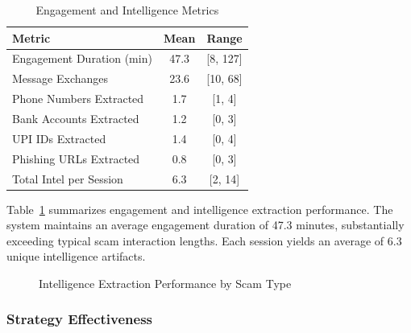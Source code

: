 \documentclass[conference]{IEEEtran}
\begin{document}
\begin{table}[htbp]
\caption{Engagement and Intelligence Metrics}
\label{tab:engagement}
\begin{center}
\begin{tabular}{|l|c|c|}
\hline
\textbf{Metric} & \textbf{Mean} & \textbf{Range} \\
\hline
Engagement Duration (min) & 47.3 & [8, 127] \\
\hline
Message Exchanges & 23.6 & [10, 68] \\
\hline
Phone Numbers Extracted & 1.7 & [1, 4] \\
\hline
Bank Accounts Extracted & 1.2 & [0, 3] \\
\hline
UPI IDs Extracted & 1.4 & [0, 4] \\
\hline
Phishing URLs Extracted & 0.8 & [0, 3] \\
\hline
Total Intel per Session & 6.3 & [2, 14] \\
\hline
\end{tabular}
\end{center}
\end{table}

Table~\ref{tab:engagement} summarizes engagement and intelligence extraction performance. The system maintains an average engagement duration of 47.3 minutes, substantially exceeding typical scam interaction lengths. Each session yields an average of 6.3 unique intelligence artifacts.

\begin{figure}[htbp]
\centerline{}
\caption{Intelligence Extraction Performance by Scam Type}
\label{fig:extraction}
\end{figure}

\subsubsection{Strategy Effectiveness}
\end{document}
